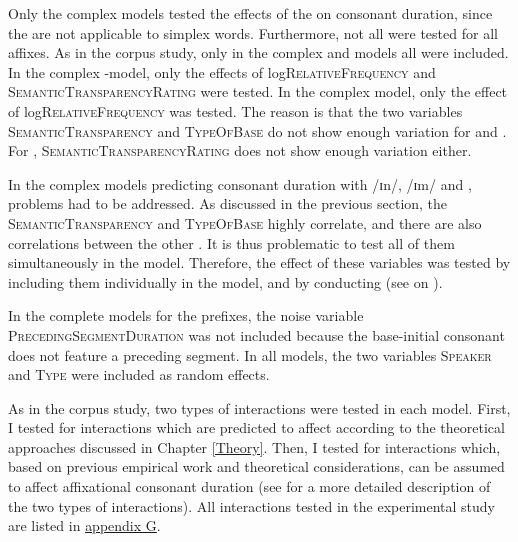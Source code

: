 Only the complex models tested the effects of the  on consonant duration, since the  are not applicable to simplex words.
Furthermore, not all  were tested for all affixes. As in the corpus study, only in the complex   and models all  were included. In the complex -model, only the effects of log\textsc{RelativeFrequency} and \textsc{SemanticTransparencyRating} were tested. In the complex model, only the effect of log\textsc{RelativeFrequency} was tested. The reason is that the two variables  \textsc{SemanticTransparency} and \textsc{TypeOfBase} do not show enough variation for  and . For , \textsc{SemanticTransparencyRating} does not show enough variation either.


In the complex models predicting consonant duration with /ɪn/, /ɪm/ and ,  problems had to be addressed. As discussed in the previous section, the  \textsc{SemanticTransparency} and \textsc{TypeOfBase} highly correlate, and there are also correlations between the other . It is thus problematic to test all of them simultaneously in the model. Therefore, the effect of these variables was tested by including them individually in the model, and by conducting  (see  on ). 

In the complete models for the prefixes, the noise variable \textsc{PrecedingSegmentDuration} was not included because the base-initial consonant does not feature a preceding segment. In all models, the two variables \textsc{Speaker} and \textsc{Type} were included as random effects.


As in the corpus study, two types of interactions were tested in each model. First, I tested for interactions which are predicted to affect  according to the theoretical approaches discussed in Chapter \ref{Theory}. Then, I tested for interactions which, based on previous empirical work and theoretical considerations, can be assumed to affect affixational consonant duration  (see  for a more detailed description of the two types of interactions). 
 All interactions tested in the experimental study are listed in \hyperref[Appendix G Summaries of tested interactions in experimental study]{appendix G}.


